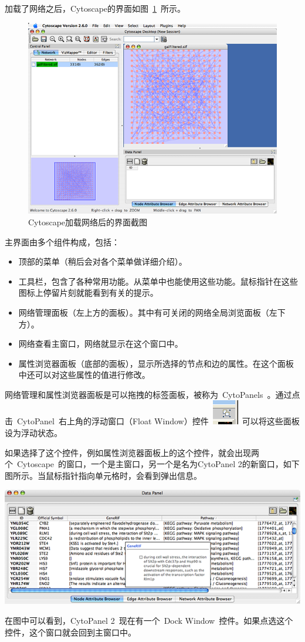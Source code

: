 加载了网络之后，Cytoscape的界面如图~\ref{fig:2.1}~所示。

\begin{figure}[!h]
\centering
\includegraphics[width=\textwidth]{images/cytoscape_startup_network_26.png}
\caption{Cytoscape加载网络后的界面截图}
\label{fig:2.1}
\end{figure}

主界面由多个组件构成，包括：
\begin{itemize}
\item 顶部的菜单（稍后会对各个菜单做详细介绍）。
\item 工具栏，包含了各种常用功能。从菜单中也能使用这些功能。鼠标指针在这些图标上停留片刻就能看到有关的提示。
\item 网络管理面板（左上方的面板）。其中有可关闭的网络全局浏览面板（左下方）。
\item 网络查看主窗口，网络就显示在这个窗口中。
\item 属性浏览器面板（底部的面板），显示所选择的节点和边的属性。在这个面板中还可以对这些属性的值进行修改。
\end{itemize}

网络管理和属性浏览器面板是可以拖拽的标签面板，被称为~CytoPanels~。通过点击~CytoPanel~右上角的浮动窗口（Float Window）控件~\includegraphics{images/float_icon.png}~可以将这些面板设为浮动状态。

如果选择了这个控件，例如属性浏览器面板上的这个控件，就会出现两个~Cytoscape~的窗口，一个是主窗口，另一个是名为CytoPanel 2的新窗口，如下图所示。当鼠标指针指向单元格时，会看到弹出信息。

{\centering
\includegraphics[width=\textwidth]{images/attribute_browser_26.png}
}

在图中可以看到，CytoPanel 2~现在有一个~Dock Window~控件。如果点选这个控件，这个窗口就会回到主窗口中。


